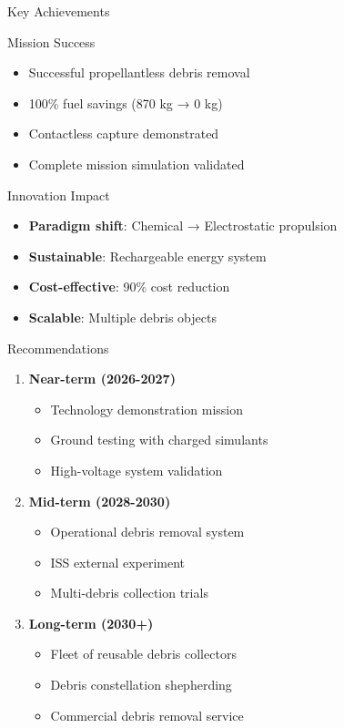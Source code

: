 \documentclass[aspectratio=169]{beamer}
\begin{document}
\begin{frame}{Key Achievements}
\begin{block}{Mission Success}
\begin{itemize}
    \item[\checkmark] Successful propellantless debris removal
    \item[\checkmark] 100\% fuel savings (870 kg → 0 kg)
    \item[\checkmark] Contactless capture demonstrated
    \item[\checkmark] Complete mission simulation validated
\end{itemize}
\end{block}

\begin{block}{Innovation Impact}
\begin{itemize}
    \item \textbf{Paradigm shift}: Chemical → Electrostatic propulsion
    \item \textbf{Sustainable}: Rechargeable energy system
    \item \textbf{Cost-effective}: 90\% cost reduction
    \item \textbf{Scalable}: Multiple debris objects
\end{itemize}
\end{block}
\end{frame}

\begin{frame}{Recommendations}
\begin{enumerate}
    \item \textbf{Near-term (2026-2027)}
    \begin{itemize}
        \item Technology demonstration mission
        \item Ground testing with charged simulants
        \item High-voltage system validation
    \end{itemize}

    \item \textbf{Mid-term (2028-2030)}
    \begin{itemize}
        \item Operational debris removal system
        \item ISS external experiment
        \item Multi-debris collection trials
    \end{itemize}

    \item \textbf{Long-term (2030+)}
    \begin{itemize}
        \item Fleet of reusable debris collectors
        \item Debris constellation shepherding
        \item Commercial debris removal service
    \end{itemize}
\end{enumerate}
\end{frame}
\end{document}
